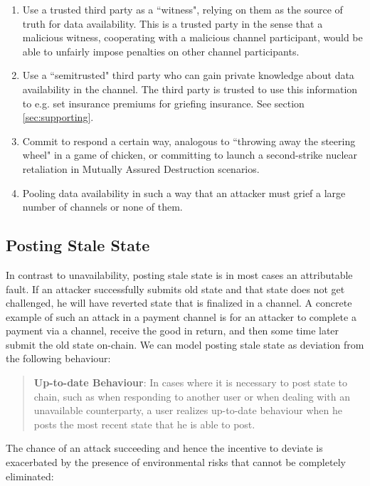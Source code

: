 \documentclass[prb,floatfix,reprint,nofootinbib,amsmath,amssymb,epsfig,pre,floats,letterpaper,groupedaffiliation,tightenlines,allcolors=blue,11pt]{revtex4}
\theoremstyle{definition}
\theoremstyle{definition}
\theoremstyle{definition}
\begin{document}
\begin{enumerate}
    \item Use a trusted third party as a ``witness", relying on them as the source of truth for data availability. This is a trusted party in the sense that a malicious witness, cooperating with a malicious channel participant, would be able to unfairly impose penalties on other channel participants.
    \item Use a ``semitrusted" third party who can gain private knowledge about data availability in the channel. The third party is trusted to use this information to e.g. set insurance premiums for griefing insurance. See section \ref{sec:supporting}.
    \item Commit to respond a certain way, analogous to ``throwing away the steering wheel" in a game of chicken, or committing to launch a second-strike nuclear retaliation in Mutually Assured Destruction scenarios.
    \item Pooling data availability in such a way that an attacker must grief a large number of channels or none of them.
\end{enumerate}

\subsection{Posting Stale State}

In contrast to unavailability, posting stale state is in most cases an attributable fault. If an attacker successfully submits old state and that state does not get challenged, he will have reverted state that is finalized in a channel. A concrete example of such an attack in a payment channel is for an attacker to complete a payment via a channel, receive the good in return, and then some time later submit the old state on-chain. We can model posting stale state as deviation from the following behaviour:

\begin{quote}
\textbf{Up-to-date Behaviour}: In cases where it is necessary to post state to chain, such as when responding to another user or when dealing with an unavailable counterparty, a user realizes up-to-date behaviour when he posts the most recent state that he is able to post.
\end{quote}

The chance of an attack succeeding and hence the incentive to deviate is exacerbated by the presence of environmental risks that cannot be completely eliminated:
\end{document}
